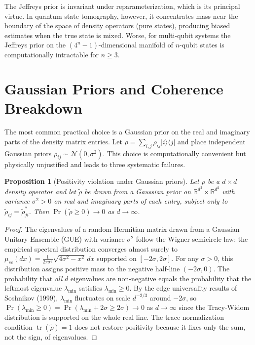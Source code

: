 \documentclass[11pt, openright, twoside]{book}
\theoremstyle{plain}
\newtheorem{proposition}[theorem]{Proposition}
\theoremstyle{definition}
\theoremstyle{remark}
\newcommand{\Normal}{\mathcal{N}}
\begin{document}
The Jeffreys prior is invariant under reparameterization, which is its principal virtue.
In quantum state tomography, however, it concentrates mass near the boundary of the space
of density operators (pure states), producing biased estimates when the true state is mixed.
Worse, for multi-qubit systems the Jeffreys prior on the $(4^n - 1)$-dimensional manifold
of $n$-qubit states is computationally intractable for $n \geq 3$.

\section{Gaussian Priors and Coherence Breakdown}

The most common practical choice is a Gaussian prior on the real and imaginary parts of the
density matrix entries. Let $\rho = \sum_{i,j} \rho_{ij} |i\rangle\langle j|$ and place
independent Gaussian priors $\rho_{ij} \sim \Normal(0, \sigma^2)$. This choice is
computationally convenient but physically unjustified and leads to three systematic failures.

\begin{proposition}[Positivity violation under Gaussian priors]
\label{prop:gaussian_failure}
Let $\rho$ be a $d \times d$ density operator and let $\tilde{\rho}$ be drawn from a
Gaussian prior on $\mathbb{R}^{d^2} \times \mathbb{R}^{d^2}$ with variance $\sigma^2 > 0$
on real and imaginary parts of each entry, subject only to $\tilde{\rho}_{ij} = \tilde{\rho}_{ji}^*$.
Then $\Pr(\tilde{\rho} \geq 0) \to 0$ as $d \to \infty$.
\end{proposition}

\begin{proof}
The eigenvalues of a random Hermitian matrix drawn from a Gaussian Unitary Ensemble (GUE)
with variance $\sigma^2$ follow the Wigner semicircle law: the empirical spectral distribution
converges almost surely to $\mu_{sc}(dx) = \frac{1}{2\pi\sigma^2}\sqrt{4\sigma^2 - x^2}\,dx$
supported on $[-2\sigma, 2\sigma]$. For any $\sigma > 0$, this distribution assigns positive
mass to the negative half-line $(-2\sigma, 0)$. The probability that \emph{all} $d$
eigenvalues are non-negative equals the probability that the leftmost eigenvalue $\lambda_{\min}$
satisfies $\lambda_{\min} \geq 0$. By the edge universality results of Soshnikov (1999),
$\lambda_{\min}$ fluctuates on scale $d^{-2/3}$ around $-2\sigma$, so
$\Pr(\lambda_{\min} \geq 0) = \Pr(\lambda_{\min} + 2\sigma \geq 2\sigma) \to 0$
as $d\to\infty$ since the Tracy-Widom distribution is supported on the whole real line.
The trace normalization condition $\operatorname{tr}(\tilde\rho)=1$ does not restore positivity
because it fixes only the sum, not the sign, of eigenvalues.
\end{proof}
\end{document}
